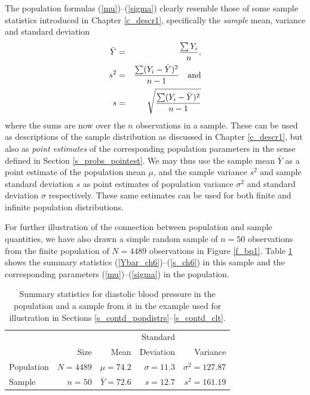 The population formulas (\ref{mu})--(\ref{sigma}) clearly resemble those of
some sample statistics introduced in Chapter
\ref{c_descr1}, specifically the \emph{sample} mean, variance and
standard deviation
\begin{eqnarray}
\bar{Y}&=&\frac{\sum Y_{i}}{n}, \label{Ybar_ch6} \\[.3ex]
s^{2} &=& \frac{\sum (Y_{i}-\bar{Y})^{2}}{n-1} \hspace*{1em}\text{and}
\label{s2_ch6} \\[.3ex]
s &=& \sqrt{\frac{\sum (Y_{i}-\bar{Y})^{2}}{n-1}}
\label{s_ch6}
\end{eqnarray}
where the sums are now over the $n$ observations in a sample. These can
be used as descriptions of the sample distribution as discussed in
Chapter \ref{c_descr1}, but also as \emph{point estimates} of the
corresponding population parameters in the sense defined in Section
\ref{s_probs_pointest}. We may thus use the sample mean $\bar{Y}$ as a
point estimate of the population mean $\mu$, and the sample variance
$s^{2}$ and sample standard deviation $s$ as point estimates of
population variance $\sigma^{2}$ and standard deviation $\sigma$
respectively. These same estimates can be used for both finite and
infinite population distributions.

For further illustration of the connection between population and
sample quantities, we have also drawn a simple random sample of $n=50$
observations from the finite population of $N=4489$ observations in
Figure \ref{f_bp1}. Table \ref{t_bp_example} shows the summary
statistics (\ref{Ybar_ch6})--(\ref{s_ch6}) in this sample and the
corresponding parameters (\ref{mu})--(\ref{sigma}) in the population.

\begin{table}
\caption{Summary statistics for diastolic blood pressure in the
population and a sample from it in the example used for illustration
in Sections \ref{s_contd_popdistrs}--\ref{s_contd_clt}.}
\label{t_bp_example}
\begin{center}
\begin{tabular}{|l|rrrr|}\hline
& & & Standard & \\
& Size & Mean & Deviation & Variance \\ \hline
Population
\rule[-3mm]{0mm}{8mm}
& $N=4489$ & $\mu=74.2$ & $\sigma=11.3$ &
$\sigma^{2}=127.87$ \\ \hline
Sample
\rule[-3mm]{0mm}{8mm}
& $n=50$ & $\bar{Y}=72.6$ & $s=12.7$ & $s^{2}=161.19$ \\
\hline
\end{tabular}
\end{center}
\end{table}

